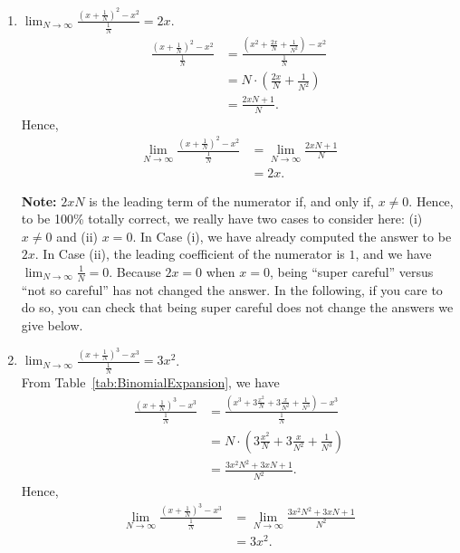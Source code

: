     \begin{enumerate}
\renewcommand{\labelenumi}{(\alph{enumi})}
\setlength{\itemsep}{.2cm}
     \item  \Ans $\displaystyle\lim_{N \to \infty} \frac{(x + \frac{1}{N})^2 - x^2}{\frac{1}{N}} = 2x$. \\

     \begin{align*}
         \frac{(x + \frac{1}{N})^2 - x^2}{\frac{1}{N}} & = \frac{(x^2 + \frac{2x}{N} + \frac{1}{N^2} ) - x^2}{\frac{1}{N}} \\
         & = N \cdot \left( \frac{2x}{N} + \frac{1}{N^2} \right) \\
         & = \frac{2xN + 1}{N}.
     \end{align*}
     Hence, 
    \begin{align*}
        \displaystyle\lim_{N \to \infty}  \frac{(x + \frac{1}{N})^2 - x^2}{\frac{1}{N}} & = \displaystyle\lim_{N \to \infty} \frac{2xN + 1}{N} \\
        &= 2x.
    \end{align*}

\textbf{Note:} $2x N$ is the leading term of the numerator if, and only if, $x \neq 0$. Hence, to be 100\% totally correct, we really have two cases to consider here: (i) $x \neq 0$ and (ii) $x=0$. In Case (i), we have already computed the answer to be $2x$. In Case (ii), the leading coefficient of the numerator is $1$, and we have $\displaystyle\lim_{N \to \infty} \frac{1}{N} = 0$. Because $2x = 0$ when $x=0$, being ``super careful'' versus ``not so careful'' has not changed the answer. In the following, if you care to do so, you can check that being super careful does not change the answers we give below.

      \item  \Ans $\displaystyle\lim_{N \to \infty} \frac{(x + \frac{1}{N})^3 - x^3}{\frac{1}{N}} = 3 x^2$.\\

From Table~\ref{tab:BinomialExpansion}, we have
           \begin{align*}
         \frac{(x + \frac{1}{N})^3 - x^3}{\frac{1}{N}} & = \frac{(x^3 + 3\frac{x^2}{N} + 3\frac{x}{N^2} + \frac{1}{N^3} ) - x^3}{\frac{1}{N}} \\
         & = N \cdot  \left( 3\frac{x^2}{N} + 3\frac{x}{N^2} + \frac{1}{N^3} \right) \\
         & = \frac{3x^2N^2 + 3 x N + 1}{N^2}.
     \end{align*}
     Hence, 
    \begin{align*}
        \displaystyle\lim_{N \to \infty} \frac{(x + \frac{1}{N})^3 - x^3}{\frac{1}{N}} & = \displaystyle\lim_{N \to \infty} \frac{3x^2N^2 + 3 x N + 1}{N^2}\\
        &= 3 x^2.
    \end{align*}


\end{enumerate}
